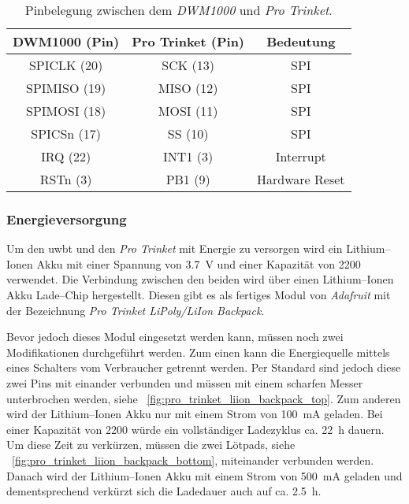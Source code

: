 \begin{table}
	\centering
	\begin{tabular}{||c|c|c||} 
		\hline
		DWM1000 (Pin)&Pro Trinket (Pin)&Bedeutung\\\hline
		\hline
		SPICLK (20)&SCK (13)&SPI\\\hline
		SPIMISO (19)&MISO (12)&SPI\\\hline
		SPIMOSI (18)&MOSI (11)&SPI\\\hline
		SPICSn (17)&SS (10)&SPI\\\hline
		\hline
		IRQ (22)&INT1 (3)&Interrupt\\\hline
		\hline
		RSTn (3)&PB1 (9)&Hardware Reset\\\hline
	\end{tabular}
	\caption{Pinbelegung zwischen dem \textit{DWM1000} und \textit{Pro Trinket}.}
	\label{tab:pin_assignment_between_dwm1k_and_pro_trinket}
\end{table}


\begin{comment}
------------------------------------------------------------------------------------------
\end{comment}
\subsubsection{Energieversorgung}

Um den \Gls{uwbt} und den \textit{Pro Trinket} mit Energie zu versorgen wird ein Lithium--Ionen Akku mit einer Spannung von \SI{3.7}{\volt} und einer Kapazität von \SI{2200}{\mAh} verwendet. Die Verbindung zwischen den beiden wird über einen Lithium--Ionen Akku Lade--Chip hergestellt. Diesen gibt es als fertiges Modul von \textit{Adafruit} mit der Bezeichnung \textit{Pro Trinket LiPoly/LiIon Backpack}.

Bevor jedoch dieses Modul eingesetzt werden kann, müssen noch zwei Modifikationen durchgeführt werden. Zum einen kann die Energiequelle mittels eines Schalters vom Verbraucher getrennt werden. Per Standard sind jedoch diese zwei Pins mit einander verbunden und müssen mit einem scharfen Messer unterbrochen werden, siehe \figurename~\ref{fig:pro_trinket_liion_backpack_top}. Zum anderen wird der Lithium--Ionen Akku nur mit einem Strom von \SI{100}{\mA} geladen. Bei einer Kapazität von \SI{2200}{\mAh} würde ein vollständiger Ladezyklus ca. \SI{22}{\hour} dauern. Um diese Zeit zu verkürzen, müssen die zwei Lötpads, siehe \figurename~\ref{fig:pro_trinket_liion_backpack_bottom}, miteinander verbunden werden. Danach wird der Lithium--Ionen Akku mit einem Strom von \SI{500}{\mA} geladen und dementsprechend verkürzt sich die Ladedauer auch auf ca. \SI{2.5}{\hour}.

